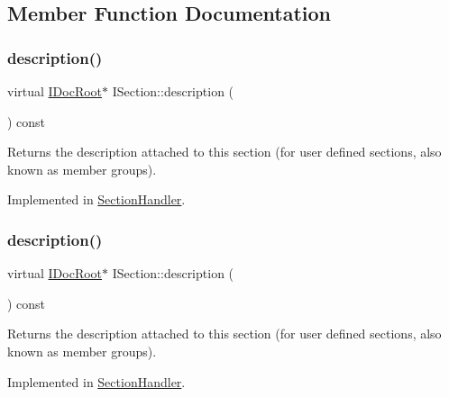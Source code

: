 \subsection{Member Function Documentation}
\mbox{\label{class_i_section_a7ebb511c977fa668611481272c97e23d}} 
\subsubsection{\texorpdfstring{description()}{description()}\hspace{0.1cm}{\footnotesize\ttfamily [1/2]}}
{\footnotesize\ttfamily virtual \mbox{\hyperlink{class_i_doc_root}{I\+Doc\+Root}}$\ast$ I\+Section\+::description (\begin{DoxyParamCaption}{ }\end{DoxyParamCaption}) const\hspace{0.3cm}{\ttfamily [pure virtual]}}

Returns the description attached to this section (for user defined sections, also known as member groups). 

Implemented in \mbox{\hyperlink{class_section_handler_a447ecf6bce811a3f12be5e90510aa880}{Section\+Handler}}.

\mbox{\label{class_i_section_a7ebb511c977fa668611481272c97e23d}} 
\subsubsection{\texorpdfstring{description()}{description()}\hspace{0.1cm}{\footnotesize\ttfamily [2/2]}}
{\footnotesize\ttfamily virtual \mbox{\hyperlink{class_i_doc_root}{I\+Doc\+Root}}$\ast$ I\+Section\+::description (\begin{DoxyParamCaption}{ }\end{DoxyParamCaption}) const\hspace{0.3cm}{\ttfamily [pure virtual]}}

Returns the description attached to this section (for user defined sections, also known as member groups). 

Implemented in \mbox{\hyperlink{class_section_handler_a447ecf6bce811a3f12be5e90510aa880}{Section\+Handler}}.

